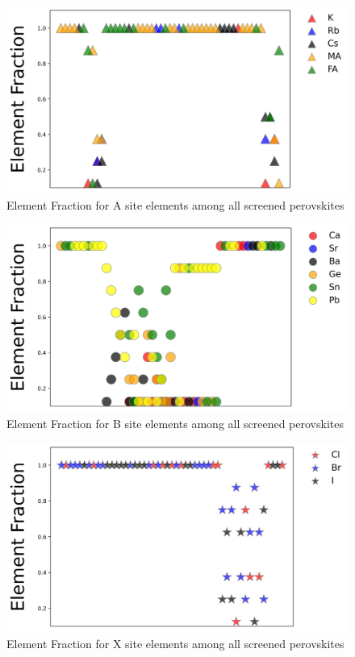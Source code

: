 \documentclass[twoside, twocolumn, 9pt, draft]{article}
\begin{document}
\begin{figure}
\centering
\includegraphics[width=.9\linewidth]{./expval/Element_AFrac.jpg}
\caption{\label{fig:sreened_frac_A} Element Fraction for A site elements among all screened perovskites}
\end{figure}

\begin{figure}
\centering
\includegraphics[width=.9\linewidth]{./expval/Element_BFrac.jpg}
\caption{\label{fig:sreened_frac_B} Element Fraction for B site elements among all screened perovskites}
\end{figure}

\begin{figure}
\centering
\includegraphics[width=.9\linewidth]{./expval/Element_XFrac.jpg}
\caption{\label{fig:sreened_frac_X} Element Fraction for X site elements among all screened perovskites}
\end{figure}
\end{document}
